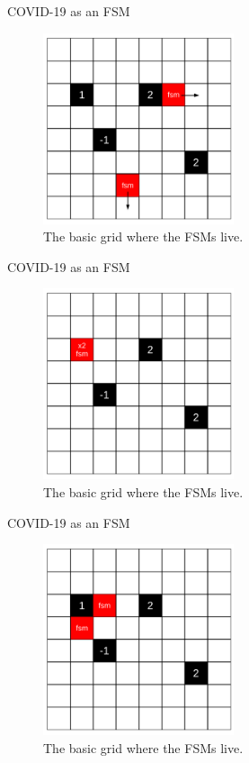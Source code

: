 \documentclass{beamer}
\begin{document}
\begin{frame}{COVID-19 as an FSM}
\begin{figure}
\centering
\includegraphics[width=0.5\textwidth]{figures/grid_food_fsm_move.pdf}
\caption{\label{fig:grid4} The basic grid where the FSMs live.}
\end{figure}
\end{frame}

\begin{frame}{COVID-19 as an FSM}
\begin{figure}
\centering
\includegraphics[width=0.5\textwidth]{figures/grid_food_fsm_reproduce.pdf}
\caption{\label{fig:grid5} The basic grid where the FSMs live.}
\end{figure}
\end{frame}

\begin{frame}{COVID-19 as an FSM}
\begin{figure}
\centering
\includegraphics[width=0.5\textwidth]{figures/grid_food_fsm_moveRepr.pdf}
\caption{\label{fig:grid6} The basic grid where the FSMs live.}
\end{figure}
\end{frame}
\end{document}
